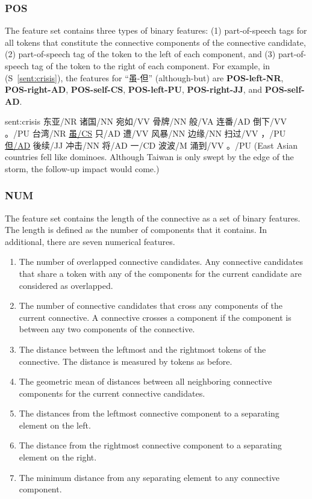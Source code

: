 


\subsubsection{POS}

The feature set contains three types of binary features:
(1) part-of-speech tags for all tokens that constitute the connective components
of the connective candidate,
(2) part-of-speech tag of the token to the left of each component, and
(3) part-of-speech tag of the token to the right of each component. For example,
in (S~\ref{sent:crisis}), the features for ``虽-但'' (although-but) are
\textbf{POS-left-NR}, \textbf{POS-right-AD}, \textbf{POS-self-CS},
\textbf{POS-left-PU}, \textbf{POS-right-JJ}, and \textbf{POS-self-AD}.

\begin{sent}{sent:crisis}{}
    东亚/NR 诸国/NN 宛如/VV 骨牌/NN 般/VA 连番/AD 倒下/VV 。/PU
    台湾/NR \underline{虽/CS} 只/AD 遭/VV 风暴/NN 边缘/NN 扫过/VV ，/PU
    \underline{但/AD} 後续/JJ 冲击/NN 将/AD 一/CD 波波/M 涌到/VV 。/PU
    (East Asian countries fell like dominoes.
    Although Taiwan is only swept by the edge of the storm,
    the follow-up impact would come.)
\end{sent}

\subsubsection{NUM}

The feature set contains the length of the connective as a set
of binary features. The length is defined as the number of components
that it contains.
In additional, there are seven numerical features.
\begin{enumerate}
    \item The number of overlapped connective candidates. Any connective
        candidates that share a token with any of the components for the current
        candidate are considered as overlapped.
    \item The number of connective candidates that cross any
        components of the current connective. A connective crosses a component
        if the component is between any two components of the connective.
    \item The distance between the leftmost and the rightmost tokens of the connective.
        The distance is measured by tokens as before.
    \item The geometric mean of distances between all neighboring connective components for
        the current connective candidates.
    \item The distances from the leftmost connective component to a separating element on the left.
    \item The distance from the rightmost connective component to a separating element on the right.
    \item The minimum distance from any separating element to any connective component.
\end{enumerate}

